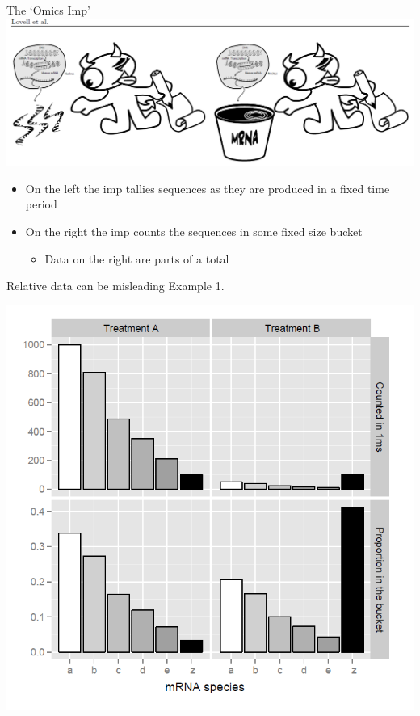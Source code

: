 \documentclass{beamer}\usepackage[]{graphicx}\usepackage[]{color}
\begin{document}
\begin{frame}{The `Omics Imp'}
\includegraphics[scale=.4]{./Figures/OmicsImp}\\
\begin{itemize}
\item On the left the imp tallies sequences as they are produced in a fixed time period
\item On the right the imp counts the sequences in some fixed size bucket
  \begin{itemize}
  \item Data on the right are parts of a total
  \end{itemize}
\end{itemize}
\end{frame}

\begin{frame}{Relative data can be misleading}
Example 1.\\
\begin{center}
\includegraphics[scale=.4]{./Figures/Zconstant}
\end{center}
\end{frame}
\end{document}
